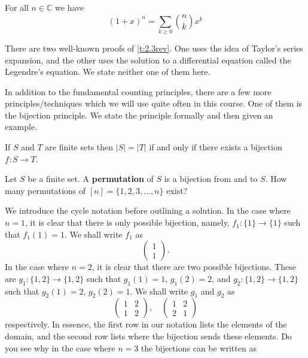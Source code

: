 \begin{theorem}
For all $n\in\mathbb{C}$ we have
\[
(1+x)^n = \sum_{k\geq 0}\binom{n}{k}x^k
\]
\label{t:2.3rev}
\end{theorem}
\begin{remark}
There are two well-known proofs of \cref{t:2.3rev}. One uses the idea of Taylor's series expansion, and the other uses the solution to a differential equation called the Legendre's equation. We state neither one of them here.  
\end{remark}
In addition to the fundamental counting principles, there are a few more principles/techniques which we will use quite often in this course. One of them is the bijection principle. We state the principle formally and then given an example.
\begin{theorem}
If $S$ and $T$ are finite sets then $|S|=|T|$ if and only if there exists a bijection $f:S\to T$.
\end{theorem}
\begin{question}
Let $S$ be a finite set. A \textbf{permutation} of $S$ is a bijection from and to $S$. How many permutations of $[n]=\{1,2,3,\ldots,n\}$ exist?
\end{question}
We introduce the cycle notation before outlining a solution. In the case where $n=1$, it is clear that there is only possible bijection, namely, $f_1:\{1\}\to\{1\}$ such that $f_1 \left(1 \right) =1$. We shall write $f_1$ as \[
\begin{pmatrix}
	1 \\ 1
\end{pmatrix}
.\] In the case where $n=2$, it is clear that there are two possible bijections. These are $g_1:\{1,2\}\to \{1,2\}$ such that $g_1\left(1 \right) =1$, $g_1\left( 2 \right)=2$, and $g_{2}:\{1,2\}\to\{1,2\}$ such that $g_{2}\left(1  \right) =2$, $g_{2}\left( 2 \right) =1$. We shall write $g_{1}$ and $g_{2}$ as \[
\begin{pmatrix} 1 & 2 \\ 1 & 2 \end{pmatrix}, \quad \begin{pmatrix} 1 & 2 \\ 2 & 1 \end{pmatrix} 
\] respectively. In essence, the first row in our notation lists the elements of the domain, and the second row lists where the bijection sends these elements. Do you see why in the case where $n=3$ the bijections can be written as 
